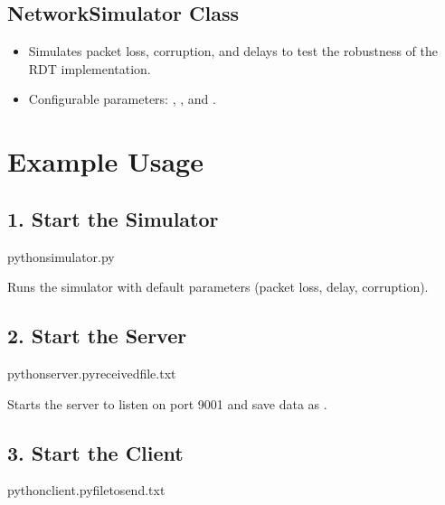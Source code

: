 \documentclass[letterpaper,10pt,english]{sphinxmanual}
\begin{document}
\subsection{NetworkSimulator Class}
\label{\detokenize{documentation:networksimulator-class}}\begin{itemize}
\item {} 
\sphinxAtStartPar
Simulates packet loss, corruption, and delays to test the robustness of the RDT implementation.

\item {} 
\sphinxAtStartPar
Configurable parameters: , , and .

\end{itemize}


\section{Example Usage}
\label{\detokenize{documentation:example-usage}}

\subsection{1. Start the Simulator}
\label{\detokenize{documentation:start-the-simulator}}
\begin{sphinxVerbatim}[commandchars=\\\{\}]
pythonsimulator.py
\end{sphinxVerbatim}

\sphinxAtStartPar
Runs the simulator with default parameters (packet loss, delay, corruption).


\subsection{2. Start the Server}
\label{\detokenize{documentation:start-the-server}}
\begin{sphinxVerbatim}[commandchars=\\\{\}]
pythonserver.pyreceived\PYGZus{}file.txt
\end{sphinxVerbatim}

\sphinxAtStartPar
Starts the server to listen on port 9001 and save data as .


\subsection{3. Start the Client}
\label{\detokenize{documentation:start-the-client}}
\begin{sphinxVerbatim}[commandchars=\\\{\}]
pythonclient.pyfile\PYGZus{}to\PYGZus{}send.txt
\end{sphinxVerbatim}
\end{document}
